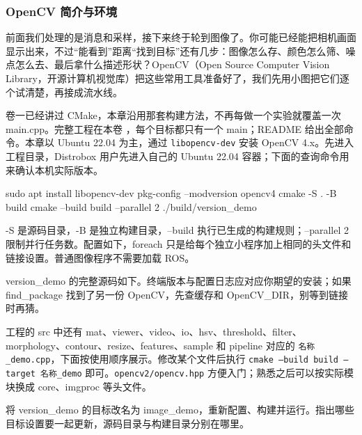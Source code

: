 \newenvironment{cvblock}{\par\medskip\noindent\begin{minipage}{\linewidth}}{\end{minipage}\par\smallskip}
\subsubsection{OpenCV 简介与环境}
前面我们处理的是消息和采样，接下来终于轮到图像了。你可能已经能把相机画面显示出来，不过“能看到”距离“找到目标”还有几步：图像怎么存、颜色怎么筛、噪点怎么去、最后拿什么描述形状？OpenCV（Open Source Computer Vision Library，开源计算机视觉库）把这些常用工具准备好了，我们先用小图把它们逐个试清楚，再接成流水线。

卷一已经讲过 CMake，本章沿用那套构建方法，不再每做一个实验就覆盖一次 main.cpp。完整工程在本卷 ，每个目标都只有一个 main；README 给出全部命令。本章以 Ubuntu 22.04 为主，通过 \texttt{libopencv-dev} 安装 OpenCV 4.x。先进入工程目录，Distrobox 用户先进入自己的 Ubuntu 22.04 容器；下面的查询命令用来确认本机实际版本。
\begin{example}
\begin{cvblock}
\begin{tbash}
sudo apt install libopencv-dev
pkg-config --modversion opencv4
cmake -S . -B build
cmake --build build --parallel 2
./build/version_demo
\end{tbash}
\end{cvblock}
-S 是源码目录，-B 是独立构建目录，--build 执行已生成的构建规则；--parallel 2 限制并行任务数。配置如下，foreach 只是给每个独立小程序加上相同的头文件和链接设置。普通图像程序不需要加载 ROS。
\begin{cvblock}

\end{cvblock}
version\_demo 的完整源码如下。终端版本与配置日志应对应你期望的安装；如果 find\_package 找到了另一份 OpenCV，先查缓存和 OpenCV\_DIR，别等到链接时再猜。
\begin{cvblock}

\end{cvblock}
工程的 src 中还有 mat、viewer、video、io、hsv、threshold、filter、morphology、contour、resize、features、sample 和 pipeline 对应的 \texttt{名称\_demo.cpp}，下面按使用顺序展示。修改某个文件后执行 \texttt{cmake --build build --target 名称\_demo} 即可。\texttt{opencv2/opencv.hpp} 方便入门；熟悉之后可以按实际模块换成 core、imgproc 等头文件。
\end{example}
\begin{exercise}\label{ex:v2-cv-build}
将 version\_demo 的目标改名为 image\_demo，重新配置、构建并运行。指出哪些目标设置要一起更新，源码目录与构建目录分别在哪里。
\end{exercise}

